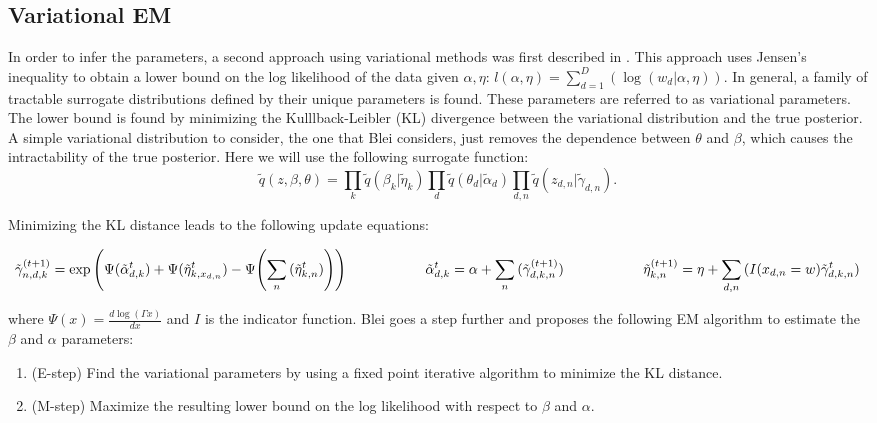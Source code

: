 \documentclass[12pt]{report}
\begin{document}
\begin{flushleft}
\section{Variational EM}
\noindent In order to infer the parameters, a second approach using variational methods was first described in \cite{lda}. This approach uses Jensen's inequality to obtain a lower bound on the log likelihood of the data given $\alpha, \eta$: $l(\alpha, \eta)=\sum_{d=1}^{D}{(\log{(w_{d} | \alpha, \eta)})}$. In general, a family of tractable surrogate distributions defined by their unique parameters is found. These parameters are referred to as variational parameters. The lower bound is found by minimizing the Kulllback-Leibler (KL) divergence between the variational distribution and the true posterior. A simple variational distribution to consider, the one that Blei considers, just removes the dependence between $\theta$ and $\beta$, which causes the intractability of the true posterior. Here we will use the following surrogate function:
$$
\tilde{q}(z, \beta, \theta)=\prod_{k}{\tilde{q}(\beta_{k} | \tilde{\eta}_{k})}\prod_{d}{\tilde{q}(\theta_{d} | \tilde{\alpha}_{d})} \prod_{d,n}{\tilde{q}(z_{d,n} | \tilde{\gamma}_{d,n})}.
$$

Minimizing the KL distance leads to the following update equations:

\begin{equation} \label{eq6}
\tilde{\gamma}^{(t+1)}_{n,d,k}=\exp{\left(\Psi{(\tilde{\alpha}^{t}_{d,k})}+\Psi{(\tilde{\eta}^{t}_{k,x_{d,n}})}-\Psi{\left(\sum_{n}{(\tilde{\eta}^{t}_{k,n})}\right)}\right)} \hspace{20mm} \tilde{\alpha}^{t}_{d,k}=\alpha+\sum_{n}{(\tilde{\gamma}^{(t+1)}_{d,k,n})} \hspace{20mm} \tilde{\eta}^{(t+1)}_{k,n}=\eta+\sum_{d,n}{(I(x_{d,n}=w)\tilde{\gamma}^{t}_{d,k,n})} 
\end{equation}

where $\Psi(x)=\frac{d\log{(\Gamma{x} ) } }{dx}$ and $I$ is the indicator function. Blei goes a step further and proposes the following EM algorithm to estimate the $\beta$ and $\alpha$ parameters:

\begin{enumerate}
	\item (E-step) Find the variational parameters by using a fixed point iterative algorithm to minimize the KL distance.
	\item (M-step) Maximize the resulting lower bound on the log likelihood with respect to $\beta$ and $\alpha$.
\end{enumerate}  


\end{flushleft}
\end{document}
